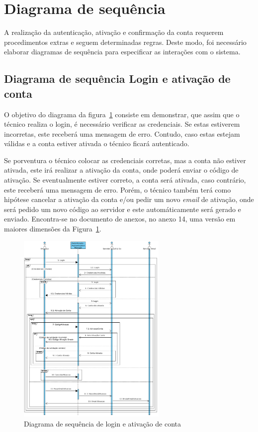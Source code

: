 \newpage

\section{Diagrama de sequência}

A realização da autenticação, ativação e confirmação da conta requerem procedimentos extras e seguem determinadas regras. Deste modo, foi necessário elaborar diagramas de sequência para especificar as interações com o sistema.

\subsection{Diagrama de sequência Login e ativação de conta}\label{sec:sequencia_login}

O objetivo do diagrama da figura~\ref{fig:43} consiste em demonstrar, que assim que o técnico realiza o login, é necessário verificar as credenciais. Se estas estiverem incorretas, este receberá uma mensagem de erro. Contudo, caso estas estejam válidas e a conta estiver ativada o técnico ficará autenticado. 

Se porventura o técnico colocar as credenciais corretas, mas a conta não estiver ativada, este irá realizar a ativação da conta, onde poderá enviar o código de ativação. Se eventualmente estiver correto, a conta será ativada, caso contrário, este receberá uma mensagem de erro. Porém, o técnico também terá como hipótese cancelar a ativação da conta e/ou pedir um novo \textit{email} de ativação, onde será pedido um novo código ao servidor e este automáticamente será gerado e enviado. Encontra-se no documento de anexos, no anexo 14, uma versão em maiores dimensões da Figura~\ref*{fig:43}.


\begin{figure}[htb]
  \centering
  \includegraphics[width=0.64\textwidth]{images/diagramas/sequencia/diagrama_login.png}
  \caption{Diagrama de sequência de login e ativação de conta}
  \label{fig:43}
\end{figure}

